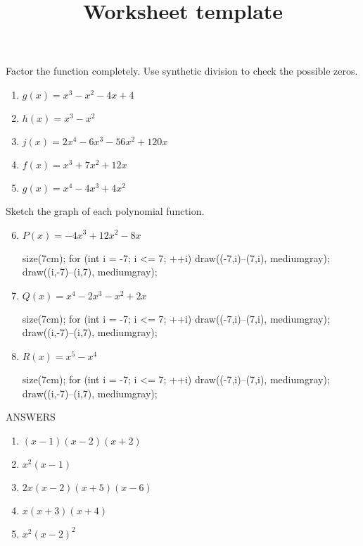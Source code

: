 \documentclass[12pt]{article}
\title{Worksheet template}
\begin{document}
\bigskip
\bigskip

Factor the function completely.  Use synthetic division to check the possible zeros.

\begin{enumerate}
	\item $g(x) = x^3 - x^2 - 4x + 4$
 	\item $h(x) = x^3 - x^2$
    \item $j(x) = 2x^4 - 6x^3 - 56x^2 + 120x$
    \item $f(x) = x^3 + 7x^2 + 12x$
    \item $g(x) = x^4 - 4x^3 + 4x^2$
\end{enumerate}

Sketch the graph of each polynomial function.

\bigskip

\begin{enumerate}
\setcounter{enumi}{5}

	\item $P(x) = -4x^3 + 12x^2 - 8x$
	\begin{flushright}
	\begin{asy}
	size(7cm);
	for (int i = -7; i <= 7; ++i)
	{
    	draw((-7,i)--(7,i), mediumgray);
	    draw((i,-7)--(i,7), mediumgray);
    }
	\end{asy}
	\end{flushright}

    \item $Q(x) = x^4 - 2x^3 - x^2 + 2x$
    
	\begin{flushright}
	\begin{asy}
	size(7cm);
	for (int i = -7; i <= 7; ++i)
	{
    	draw((-7,i)--(7,i), mediumgray);
	    draw((i,-7)--(i,7), mediumgray);
    }
	\end{asy}
	\end{flushright}

\newpage

	\item $R(x) = x^5 - x^4$
    
	\begin{flushright}
	\begin{asy}
	size(7cm);
	for (int i = -7; i <= 7; ++i)
	{
    	draw((-7,i)--(7,i), mediumgray);
	    draw((i,-7)--(i,7), mediumgray);
    }
	\end{asy}
	\end{flushright}

\end{enumerate}

ANSWERS

\begin{multicols}{2}
\begin{enumerate}
	\item $(x-1)(x-2)(x+2)$
    \item $x^2 (x-1)$
    \item $2x(x-2)(x+5)(x-6)$
    \item $x(x+3)(x+4)$
    \item $x^2 (x-2)^2$
\end{enumerate}
\end{multicols}
\end{document}
